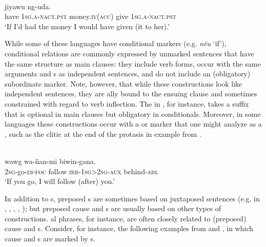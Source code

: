 \documentclass[output=paper]{langsci/langscibook}
\begin{document}
\ea\label{ex:diessel:5}
\\
            jiyawu  ng-uda.\\
       have    \textsc{1sg}.\textsc{a-nact.pst}  money.\textsc{iv(acc)}  give  1\textsc{sg.a-nact.pst}\\
\glt   `If I’d had the money I would have given (it to her).'
\z

While some of these languages have conditional markers (e.g.  \textit{nêu} ‘if’), conditional relations are commonly expressed by unmarked sentences that have the same structure as main clauses: they include  verb forms, occur with the same arguments and s as independent sentences, and do not include an (obligatory) subordinate marker. Note, however, that while these constructions look like independent sentences, they are ally bound to the ensuing clause and sometimes constrained with regard to verb inflection. The  in , for instance, takes a  suffix that is optional in main clauses but obligatory in conditionals. Moreover, in some languages these constructions occur with a  or  marker that one might analyze as a , such as the  clitic at the end of the protasis in example  from .

\ea\label{ex:diessel:6}
\\
\gll   [ña-yaŋ-gu=\textbf{bayi}]   wawg   wa-ñan-mi  biwin-gana.\\
       \textsc{2sg}-go-\textsc{di-foc}    follow   \textsc{irr-1sg>2sg-aux}  behind-\textsc{abl}\\
\glt   `If you go, I will follow (after) you.'
\z

In addition to s, preposed s are sometimes based on juxtaposed sentences (e.g. in , , , , ); but preposed cause and s are usually based on other types of constructions. al phrases, for instance, are often closely related to (preposed) cause and s. Consider, for instance, the following examples from   and  , in which cause and s are marked by  s. 
\end{document}
